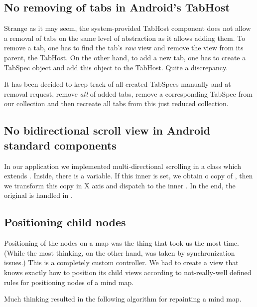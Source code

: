 \subsection{No removing of tabs in Android's TabHost}
\label{subsec:problem-tabhost}

Strange as it may seem, the system-provided TabHost component does not allow a removal of tabs on the same level of abstraction as it allows adding them. To remove a tab, one has to find the tab's \emph{raw} view and remove the view from its parent, the TabHost. On the other hand, to add a new tab, one has to create a TabSpec object and add this object to the TabHost. Quite a discrepancy.

It has been decided to keep track of all created TabSpecs manually and at removal request, remove \emph{all} of added tabs, remove a corresponding TabSpec from our collection and then recreate all tabs from this just reduced collection.

\subsection{No bidirectional scroll view in Android standard components}
\label{subsec:problem-scrollview}
In our application we implemented multi-directional scrolling in a class  which extends . Inside, there is a  variable. If this inner  is set, we obtain o copy of , then we transform this copy in X axis and dispatch to the inner . In the end, the original  is handled in .

\subsection{Positioning child nodes}
\label{subsec:problem-positioning}

Positioning of the nodes on a map was the thing that took us the most time. (While the most thinking, on the other hand, was taken by synchronization issues.) This is a completely custom controller. We had to create a view that knows exactly how to position its child views according to not-really-well defined rules for positioning nodes of a mind map.

Much thinking resulted in the following algorithm for repainting a mind map.

